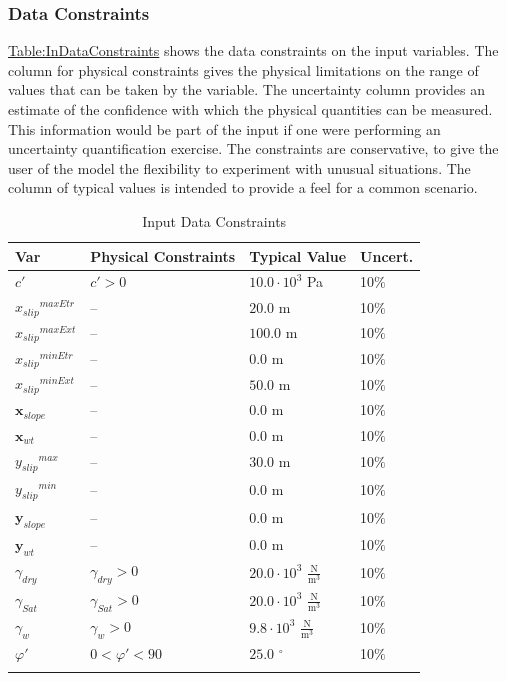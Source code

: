 \documentclass[12pt]{article}
\begin{document}
\subsubsection{Data Constraints}
\label{Sec:DataConstraints}
\hyperref[Table:InDataConstraints]{Table:InDataConstraints} shows the data constraints on the input variables. The column for physical constraints gives the physical limitations on the range of values that can be taken by the variable. The uncertainty column provides an estimate of the confidence with which the physical quantities can be measured. This information would be part of the input if one were performing an uncertainty quantification exercise. The constraints are conservative, to give the user of the model the flexibility to experiment with unusual situations. The column of typical values is intended to provide a feel for a common scenario.

\begin{longtable}{l l l l}
\toprule
\textbf{Var} & \textbf{Physical Constraints} & \textbf{Typical Value} & \textbf{Uncert.}
\\
\midrule
\endhead
$c'$ & $c'>0$ & $10.0\cdot{}10^{3}$ Pa & 10$\%$
\\
${{x_{slip}}^{maxEtr}}$ & -- & $20.0$ m & 10$\%$
\\
${{x_{slip}}^{maxExt}}$ & -- & $100.0$ m & 10$\%$
\\
${{x_{slip}}^{minEtr}}$ & -- & $0.0$ m & 10$\%$
\\
${{x_{slip}}^{minExt}}$ & -- & $50.0$ m & 10$\%$
\\
${\mathbf{x}_{slope}}$ & -- & $0.0$ m & 10$\%$
\\
${\mathbf{x}_{wt}}$ & -- & $0.0$ m & 10$\%$
\\
${{y_{slip}}^{max}}$ & -- & $30.0$ m & 10$\%$
\\
${{y_{slip}}^{min}}$ & -- & $0.0$ m & 10$\%$
\\
${\mathbf{y}_{slope}}$ & -- & $0.0$ m & 10$\%$
\\
${\mathbf{y}_{wt}}$ & -- & $0.0$ m & 10$\%$
\\
${γ_{dry}}$ & ${γ_{dry}}>0$ & $20.0\cdot{}10^{3}$ $\frac{\text{N}}{\text{m}^{3}}$ & 10$\%$
\\
${γ_{Sat}}$ & ${γ_{Sat}}>0$ & $20.0\cdot{}10^{3}$ $\frac{\text{N}}{\text{m}^{3}}$ & 10$\%$
\\
${γ_{w}}$ & ${γ_{w}}>0$ & $9.8\cdot{}10^{3}$ $\frac{\text{N}}{\text{m}^{3}}$ & 10$\%$
\\
$φ'$ & $0<φ'<90$ & $25.0$ ${}^{\circ}$ & 10$\%$
\\
\bottomrule
\caption{Input Data Constraints}
\label{Table:InDataConstraints}
\end{longtable}
\end{document}
